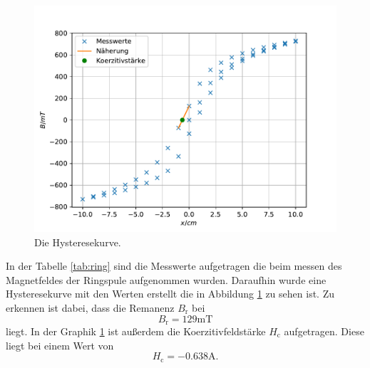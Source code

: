 \begin{figure}
\centering
\includegraphics[width=\textwidth]{content/data/plot_ring.pdf}
\caption{Die Hysteresekurve.}
\label{fig:ring}
\end{figure}

In der Tabelle \ref{tab:ring} sind die Messwerte aufgetragen die beim messen des Magnetfeldes der Ringspule aufgenommen wurden.
Daraufhin wurde eine Hysteresekurve mit den Werten erstellt die in Abbildung \ref{fig:ring} zu sehen ist.
Zu erkennen ist dabei, dass die Remanenz $B_\text{r}$ bei 
\begin{equation*}
  B_\text{r} = 129 \si{\milli\tesla}
\end{equation*}
liegt.
In der Graphik \ref{fig:ring} ist außerdem die Koerzitivfeldstärke $H_\text{c}$ aufgetragen.
Diese liegt bei einem Wert von
\begin{equation*}
  H_\text{c} = -0.638 \si{\ampere}.
\end{equation*}
